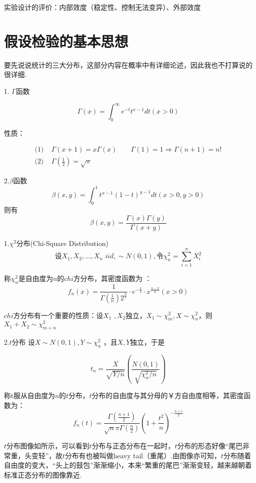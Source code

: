 实验设计的评价：内部效度（稳定性、控制无法变异）、外部效度

\section{假设检验的基本思想}

要先说说统计的三大分布，这部分内容在概率中有详细论述，因此我也不打算说的很详细.

1. $\Gamma$函数

$$
\Gamma \left( x \right) =\int_0^{\infty}{e^{-t}t^{x-1}dt\left( x>0 \right)}
$$

性质：

\begin{align*}
    \text{(1) } & \Gamma \left( x+1 \right) =x\Gamma \left( x \right)  \qquad
    \Gamma \left( 1 \right) =1\Rightarrow \Gamma \left( n+1 \right) =n! \\
    \text{(2) } & \Gamma \left( \frac{1}{2} \right) =\sqrt{\pi}
\end{align*}


2.$\beta$函数
$$
\beta \left( x,y \right) =\int_0^1{t^{x-1}\left( 1-t \right) ^{y-1}dt\left( x>0,y>0 \right)}
$$
则有	 
$$
\beta \left( x,y \right) =\frac{\Gamma \left( x \right) \Gamma \left( y \right)}{\Gamma \left( x+y \right)}
$$

1.$\chi ^2$分布(Chi-Square Distribution)
$$
\text{设}X_1, X_2,..., X_n\,\,iid,\sim N\left( 0,1 \right) , \text{令}\chi _{n}^{2}=\sum_{i=1}^n{X_{i}^{2}}
$$

称$\chi _n^2$是自由度为$n$的$chi$方分布，其密度函数为 ：
$$
f_n\left( x \right) =\frac{1}{\Gamma \left( \frac{1}{n} \right) 2^{\frac{n}{2}}}\cdot e^{-\frac{x}{2}}\cdot x^{\frac{n-2}{n}}\left( x>0 \right) 
$$

$chi$方分布有一个重要的性质：设$X_1\,\,,X_2$独立，$X_1\sim \chi _{m}^{2}, X\sim \chi _{n}^{2}$，则$X_1+X_2\sim \chi _{m+n}^{2}$ 

2.$t$分布
设$X\sim N\left( 0,1 \right) , Y\sim \chi _{n}^{2}$ ，且$X,Y$独立，于是

$$
t_n=\frac{X}{\sqrt{Y/n}}\left( \frac{N\left( 0,1 \right)}{\sqrt{\chi _{n}^{2}/n}} \right) 
$$

称t服从自由度为$n$的$t$分布，$t$分布的自由度与其分母的￥方自由度相等，其密度函数为： 
$$
f_n\left( t \right) =\frac{\Gamma \left( \frac{n+1}{2} \right)}{\sqrt{n}\pi \Gamma \left( \frac{n}{2} \right)}\left( 1+\frac{t^2}{n} \right) ^{-\frac{n+1}{2}}
$$

$t$分布图像如所示，可以看到$t$分布与正态分布在一起时，$t$分布的形态好像“尾巴非常重，头变轻”，故$t$分布有也被叫做heavy tail（重尾）.由图像亦可知，$t$分布随着自由度的变大，“头上的鼓包”渐渐缩小，本来“繁重的尾巴”渐渐变轻，越来越朝着标准正态分布的图像靠近.

